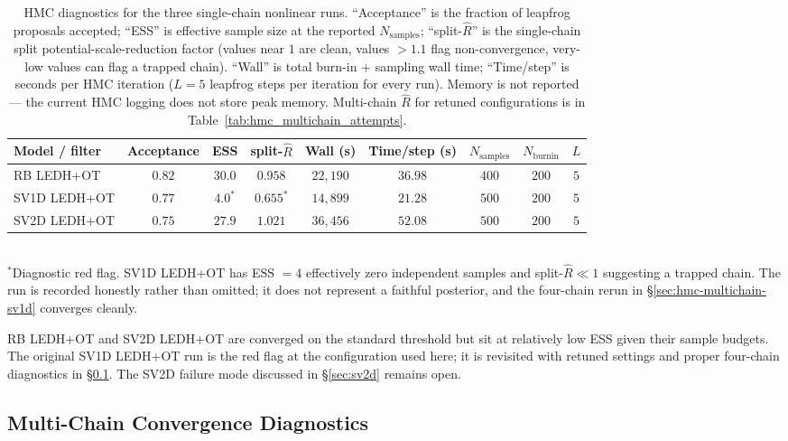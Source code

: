 \documentclass{article}
\begin{document}
\begin{table}[H]
\centering
\footnotesize
\caption{HMC diagnostics for the three single-chain nonlinear runs. ``Acceptance'' is the fraction of leapfrog proposals accepted; ``ESS'' is effective sample size at the reported $N_{\text{samples}}$; ``split-$\hat R$'' is the single-chain split potential-scale-reduction factor (values near $1$ are clean, values $> 1.1$ flag non-convergence, very-low values can flag a trapped chain). ``Wall'' is total burn-in + sampling wall time; ``Time/step'' is seconds per HMC iteration ($L = 5$ leapfrog steps per iteration for every run). Memory is not reported --- the current HMC logging does not store peak memory. Multi-chain $\hat R$ for retuned configurations is in Table~\ref{tab:hmc_multichain_attempts}.}
\label{tab:hmc_diagnostics}
\begin{tabular}{lcccccccc}
\toprule
Model / filter & Acceptance & ESS & split-$\hat R$ & Wall (s) & Time/step (s) & $N_{\text{samples}}$ & $N_{\text{burnin}}$ & $L$ \\
\midrule
RB LEDH+OT   & $0.82$ & $30.0$  & $0.958$ & $22{,}190$ & $36.98$ & $400$ & $200$ & $5$ \\
SV1D LEDH+OT & $0.77$ & $4.0^{*}$   & $0.655^{*}$ & $14{,}899$ & $21.28$ & $500$ & $200$ & $5$ \\
SV2D LEDH+OT & $0.75$ & $27.9$  & $1.021$ & $36{,}456$ & $52.08$ & $500$ & $200$ & $5$ \\
\bottomrule
\end{tabular}
\\\vspace{2pt}
{\footnotesize $^{*}$Diagnostic red flag. SV1D LEDH+OT has ESS $= 4$ effectively zero independent samples and split-$\hat R \ll 1$ suggesting a trapped chain. The run is recorded honestly rather than omitted; it does not represent a faithful posterior, and the four-chain rerun in \S\ref{sec:hmc-multichain-sv1d} converges cleanly.}
\end{table}

RB LEDH+OT and SV2D LEDH+OT are converged on the standard threshold but sit at relatively low ESS given their sample budgets. The original SV1D LEDH+OT run is the red flag at the configuration used here; it is revisited with retuned settings and proper four-chain diagnostics in \S\ref{sec:hmc-multichain}. The SV2D failure mode discussed in \S\ref{sec:sv2d} remains open.
\fi

\subsection{Multi-Chain Convergence Diagnostics}
\label{sec:hmc-multichain}
\end{document}
